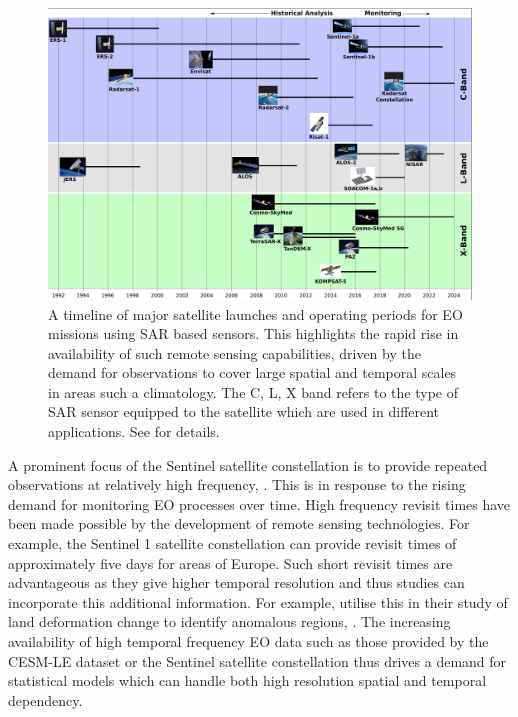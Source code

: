 \begin{figure}[htbp!] 
	\centering    
	\includegraphics[width=1.0\textwidth]{Sensors}
	\caption[Timeline of the major EO satellite launches and operation time scales.]{A timeline of major satellite launches and operating periods for EO missions using SAR based sensors. This highlights the rapid rise in availability of such remote sensing capabilities, driven by the demand for observations to cover large spatial and temporal scales in areas such a climatology. The C, L, X band refers to the type of SAR sensor equipped to the satellite which are used in different applications. See \citep{oliver_understanding_2004} for details.}
	\label{fig:sar_timeline}
\end{figure}

A prominent focus of the Sentinel satellite constellation is to provide repeated observations at relatively high frequency, \cite{aschbacher_european_2012}.
This is in response to the rising demand for monitoring EO processes over time.
High frequency revisit times have been made possible by the development of remote sensing technologies.
For example, the Sentinel 1 satellite constellation can provide revisit times of approximately five days for areas of Europe.
Such short revisit times are advantageous as they give higher temporal resolution and thus studies can incorporate this additional information.
For example, \citeauthor{raspini_continuous_2018} utilise this in their study of land deformation change to identify anomalous regions, \citep{raspini_continuous_2018}.
The increasing availability of high temporal frequency EO data such as those provided by the CESM-LE dataset or the Sentinel satellite constellation thus drives a demand for statistical models which can handle both high resolution spatial and temporal dependency.  

